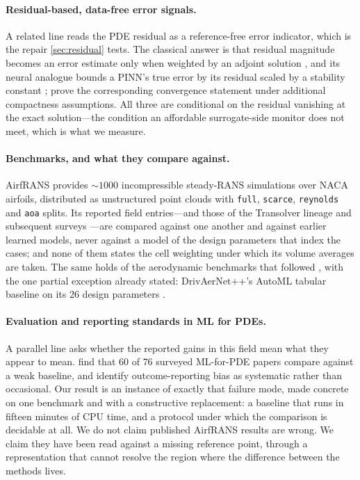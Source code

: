 \paragraph{Residual-based, data-free error signals.} A related line reads the PDE residual
as a reference-free error indicator, which is the repair \autoref{sec:residual} tests. The
classical answer is that residual magnitude becomes an error estimate only when weighted by
an adjoint solution \citep{beckerrannacher2001dwr}, and its neural analogue bounds a PINN's
true error by its residual scaled by a stability constant
\citep{hillebrecht2025posteriori}; \citet{mukherjee2026certification} prove the
corresponding convergence statement under additional compactness assumptions. All three
are conditional on the residual vanishing at the exact solution---the condition an
affordable surrogate-side monitor does not meet, which is what we measure.

\paragraph{Benchmarks, and what they compare against.} AirfRANS
\citep{bonnet2022airfrans} provides $\sim 1000$ incompressible steady-RANS simulations
over NACA airfoils, distributed as unstructured point clouds with \texttt{full},
\texttt{scarce}, \texttt{reynolds} and \texttt{aoa} splits. Its reported field entries---and
those of the Transolver lineage \citep{wu2024transolver,luo2025transolverpp} and subsequent
surveys \citep{scherz2026evaluation,rigotti2026gist}---are compared against one another and
against earlier learned models, never against a model of the design parameters that index
the cases; and none of them states the cell weighting under which its volume averages are
taken. The same holds of the aerodynamic benchmarks that followed
\citep{ahmedml2024}, with the one partial exception already stated: DrivAerNet++'s AutoML
tabular baseline on its $26$ design parameters \citep{elrefaie2024drivaernet}.

\paragraph{Evaluation and reporting standards in ML for PDEs.} A parallel line asks
whether the reported gains in this field mean what they appear to mean.
\citet{mcgreivy2024weak} find that $60$ of $76$ surveyed ML-for-PDE papers compare against
a weak baseline, and identify outcome-reporting bias as systematic rather than
occasional. Our result is an instance of exactly that failure mode, made concrete on one
benchmark and with a constructive replacement: a baseline that runs in fifteen minutes of
CPU time, and a protocol under which the comparison is decidable at all. We do not claim
published AirfRANS results are wrong. We claim they have been read against a missing
reference point, through a representation that cannot resolve the region where the
difference between the methods lives.

